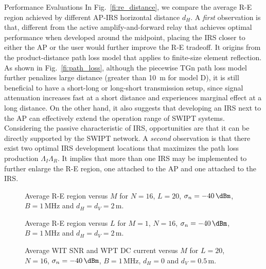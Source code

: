 \documentclass[journal]{IEEEtran}
\begin{document}
\begin{section}{Performance Evaluations}
		In Fig.~\ref{fi:re_distance}, we compare the average R-E region achieved by different AP-IRS horizontal distance $d_H$. A \textit{first} observation is that, different from the active amplify-and-forward relay that achieves optimal performance when developed around the midpoint, placing the IRS closer to either the AP or the user would further improve the R-E tradeoff. It origins from the product-distance path loss model that applies to finite-size element reflection. As shown in Fig.~\ref{fi:path_loss}, although the piecewise TGn path loss model further penalizes large distance (greater than \SI{10}{\meter} for model D), it is still beneficial to have a short-long or long-short transmission setup, since signal attenuation increases fast at a short distance and experiences marginal effect at a long distance. On the other hand, it also suggests that developing an IRS next to the AP can effectively extend the operation range of SWIPT systems. Considering the passive characteristic of IRS, opportunities are that it can be directly supported by the SWIPT network. A \textit{second} observation is that there exist two optimal IRS development locations that maximizes the path loss production $\Lambda_I\Lambda_R$. It implies that more than one IRS may be implemented to further enlarge the R-E region, one attached to the AP and one attached to the IRS.

		\begin{figure}[!t]
			\centering
			\begin{adjustbox}{width=\linewidth}
				
			\end{adjustbox}
			\caption{Average R-E region versus $M$ for $N=16$, $L=20$, $\sigma_n=-40\,\si{\dBm}$, $B=1\,\si{\MHz}$ and $d_H=d_V=2\,\si{\meter}$.}
			\label{fi:re_tx}
		\end{figure}

		\begin{figure}[!t]
			\centering
			\begin{adjustbox}{width=\linewidth}
				
			\end{adjustbox}
			\caption{Average R-E region versus $L$ for $M=1$, $N=16$, $\sigma_n=-40\,\si{\dBm}$, $B=1\,\si{\MHz}$ and $d_H=d_V=2\,\si{\meter}$.}
			\label{fi:re_reflector}
		\end{figure}

		\begin{figure}[!t]
			\centering
			\begin{adjustbox}{width=\linewidth}
				
			\end{adjustbox}
			\caption{Average WIT SNR and WPT DC current versus $M$ for $L=20$, $N=16$, $\sigma_n=-40\,\si{\dBm}$, $B=1\,\si{\MHz}$, $d_H=0$ and $d_V=0.5\,\si{\meter}$.}
			\label{fi:scaling_tx}
		\end{figure}


\end{section}
\end{document}
